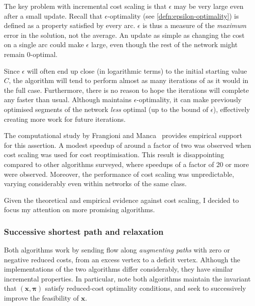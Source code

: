 The key problem with incremental cost scaling is that $\epsilon$ may be very large even after a small update. Recall that $\epsilon$-optimality (see \cref{defn:epsilon-optimality}) is defined as a property satisfied by every arc. $\epsilon$ is thus a measure of the \emph{maximum} error in the solution, not the average. An update as simple as changing the cost on a single arc could make $\epsilon$ large, even though the rest of the network might remain $0$-optimal.

Since $\epsilon$ will often end up close (in logarithmic terms) to the initial starting value $C$, the algorithm will tend to perform almost as many iterations of  as it would in the full case. Furthermore, there is no reason to hope the iterations will complete any faster than usual. Although  maintains $\epsilon$-optimality, it can make previously optimised segments of the network \emph{less} optimal (up to the bound of $\epsilon$), effectively creating more work for future iterations.

The computational study by Frangioni and Manca~\cite{Frangioni:2006} provides empirical support for this assertion. A modest speedup of around a factor of two was observed when cost scaling was used for cost reoptimisation. This result is disappointing compared to other algorithms surveyed, where speedups of a factor of 20 or more were observed. Moreover, the performance of cost scaling was unpredictable, varying considerably even within networks of the same class.

Given the theoretical and empirical evidence against cost scaling, I decided to focus my attention on more promising algorithms.

\subsubsection{Successive shortest path and relaxation}

Both algorithms work by sending flow along \emph{augmenting paths} with zero or negative reduced costs, from an excess vertex to a deficit vertex. Although the implementations of the two algorithms differ considerably, they have similar incremental properties. In particular, note both algorithms maintain the invariant that $\left(\mathbf{x},\boldsymbol{\pi}\right)$ satisfy reduced-cost optimality conditions, and seek to successively improve the feasibility of $\mathbf{x}$\footnotemark.

